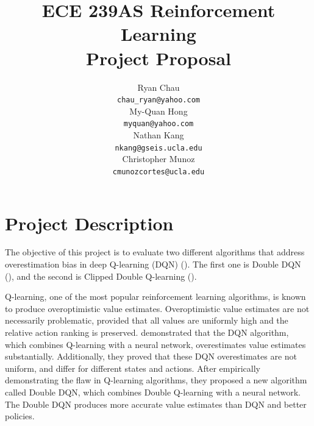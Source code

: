 \documentclass{article}
\title{ECE 239AS Reinforcement Learning\\
       Project Proposal}
\author{%
    Ryan Chau \\
    \texttt{chau\_ryan@yahoo.com}\\
    \And
    My-Quan Hong \\
    \texttt{myquan@yahoo.com} \\
    \And
    Nathan Kang \\
    \texttt{nkang@gseis.ucla.edu} \\
    \And
    Christopher Munoz \\
    \texttt{cmunozcortes@ucla.edu} \\
}
\begin{document}
\maketitle

\section{Project Description}


The objective of this project is to evaluate two different algorithms that
address overestimation bias in deep Q-learning (DQN) (\citet{mnih2015human}).
The first one is Double DQN (\citet{van2016deep}), and the second is Clipped
Double Q-learning (\citet{fujimoto2018addressing}).

Q-learning, one of the most popular reinforcement learning algorithms, is known
to produce overoptimistic value estimates. Overoptimistic value estimates are
not necessarily problematic, provided that all values are uniformly high and the
relative action ranking is preserved.  \citet{van2016deep} demonstrated that the
DQN algorithm, which combines Q-learning with a neural network, overestimates
value estimates substantially.  Additionally, they proved that these DQN
overestimates are not uniform, and differ for different states and actions.
After empirically demonstrating the flaw in Q-learning algorithms, they proposed
a new algorithm called Double DQN, which combines Double Q-learning with a
neural network. The Double DQN produces more accurate value estimates than DQN
and better policies.
\end{document}
